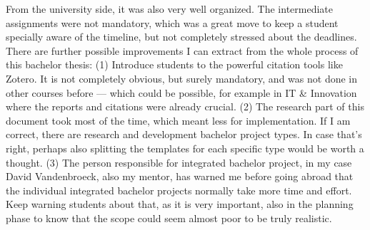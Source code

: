 
From the university side, it was also very well organized. The intermediate assignments were not mandatory, which was a great move to keep a student specially aware of the timeline, but not completely stressed about the deadlines. There are further possible improvements I can extract from the whole process of this bachelor thesis: (1) Introduce students to the powerful citation tools like Zotero. It is not completely obvious, but surely mandatory, and was not done in other courses before --- which could be possible, for example in IT \& Innovation where the reports and citations were already crucial. (2) The research part of this document took most of the time, which meant less for implementation. If I am correct, there are research and development bachelor project types. In case that's right, perhaps also splitting the templates for each specific type would be worth a thought. (3) The person responsible for integrated bachelor project, in my case David Vandenbroeck, also my mentor, has warned me before going abroad that the individual integrated bachelor projects normally take more time and effort. Keep warning students about that, as it is very important, also in the planning phase to know that the scope could seem almost poor to be truly realistic.